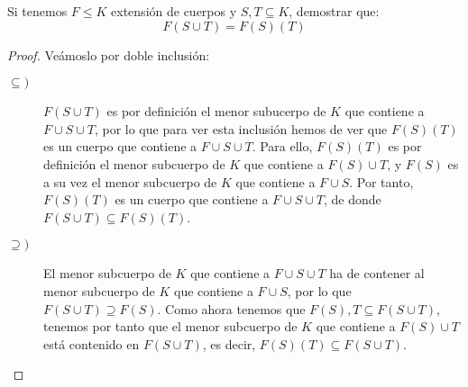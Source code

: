 \begin{ejercicio}
    Si tenemos $F\leq K$ extensión de cuerpos y $S,T\subseteq K$, demostrar que:
    \begin{equation*}
        F(S\cup T) = F(S)(T)
    \end{equation*}
    \begin{proof}
        Veámoslo por doble inclusión:
        \begin{description}
            \item [$\subseteq )$] $F(S\cup T)$ es por definición el menor subucerpo de $K$ que contiene a $F\cup S\cup T$, por lo que para ver esta inclusión hemos de ver que $F(S)(T)$ es un cuerpo que contiene a $F\cup S\cup T$. Para ello, $F(S)(T)$ es por definición el menor subcuerpo de $K$ que contiene a $F(S)\cup T$, y $F(S)$ es a su vez el menor subcuerpo de $K$ que contiene a $F\cup S$. Por tanto, $F(S)(T)$ es un cuerpo que contiene a $F\cup S\cup T$, de donde $F(S\cup T)\subseteq F(S)(T)$.
            \item [$\supseteq )$] El menor subcuerpo de $K$ que contiene a $F\cup S\cup T$ ha de contener al menor subcuerpo de $K$ que contiene a $F\cup S$, por lo que $F(S\cup T)\supseteq F(S)$. Como ahora tenemos que $F(S),T\subseteq F(S\cup T)$, tenemos por tanto que el menor subcuerpo de $K$ que contiene a $F(S)\cup T$ está contenido en $F(S\cup T)$, es decir, $F(S)(T)\subseteq F(S\cup T)$.
        \end{description}
    \end{proof}
\end{ejercicio}

